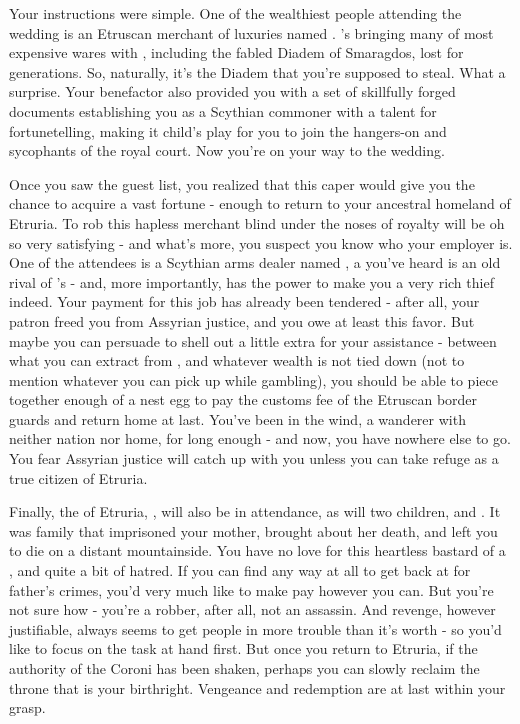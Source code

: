 \documentclass[char]{Kos}
\begin{document}
    Your instructions were simple. One of the wealthiest people attending the wedding is an Etruscan merchant of luxuries named \cMerchant{}. \cMerchant{\They}'s bringing many of \cMerchant{\their} most expensive wares with \cMerchant{\them}, including the fabled Diadem of Smaragdos, lost for generations. So, naturally, it's the Diadem that you're supposed to steal. What a surprise. Your benefactor also provided you with a set of skillfully forged documents establishing you as a Scythian commoner with a talent for fortunetelling, making it child's play for you to join the hangers-on and sycophants of the royal court. Now you're on your way to the wedding. 
    
    Once you saw the guest list, you realized that this caper would give you the chance to acquire a vast fortune - enough to return to your ancestral homeland of Etruria. To rob this hapless merchant blind under the noses of royalty will be oh so very satisfying - and what's more, you suspect you know who your employer is. One of the attendees is a Scythian arms dealer named \cArmsDealer{}, a \cArmsDealer{\human} you've heard is an old rival of \cMerchant{}'s - and, more importantly, \cArmsDealer{\they} has the power to make you a very rich thief indeed. Your payment for this job has already been tendered - after all, your patron freed you from Assyrian justice, and you owe \cArmsDealer{\them} at least this favor. But maybe you can persuade \cArmsDealer{\them} to shell out a little extra for your assistance - between what you can extract from \cArmsDealer{\them}, and whatever wealth is not tied down (not to mention whatever you can pick up while gambling), you should be able to piece together enough of a nest egg to pay the customs fee of the Etruscan border guards and return home at last. You've been in the wind, a wanderer with neither nation nor home, for long enough - and now, you have nowhere else to go. You fear Assyrian justice will catch up with you unless you can take refuge as a true citizen of Etruria.

    Finally, the \cEtruriaKing{\monarch} of Etruria, \cEtruriaKing{}, will also be in attendance, as will \cEtruriaKing{\their} two children, \cGroom{} and \cPoet{}. It was \cEtruriaKing{\their} family that imprisoned your mother, brought about her death, and left you to die on a distant mountainside. You have no love for this heartless bastard of a \cEtruriaKing{\human}, and quite a bit of hatred. If you can find any way at all to get back at \cEtruriaKing{} for \cEtruriaKing{\their} father's crimes, you'd very much like to make \cEtruriaKing{\them} pay however you can. But you're not sure how - you're a robber, after all, not an assassin. And revenge, however justifiable, always seems to get people in more trouble than it's worth - so you'd like to focus on the task at hand first. But once you return to Etruria, if the authority of the Coroni has been shaken, perhaps you can slowly reclaim the throne that is your birthright. Vengeance and redemption are at last within your grasp. 
\end{document}
